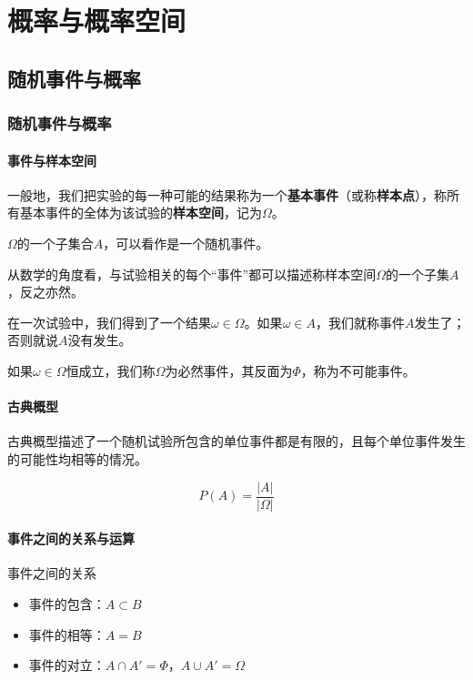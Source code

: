 \chapter{概率与概率空间}

\section{随机事件与概率}

\subsection{随机事件与概率}

\subsubsection{事件与样本空间}

一般地，我们把实验的每一种可能的结果称为一个\textbf{基本事件}（或称\textbf{样本点}），称所有基本事件的全体为该试验的\textbf{样本空间}，记为$\Omega$。

$\Omega$的一个子集合$A$，可以看作是一个随机事件。

从数学的角度看，与试验相关的每个“事件”都可以描述称样本空间$\Omega$的一个子集$A$，反之亦然。

在一次试验中，我们得到了一个结果$\omega \in \Omega$。如果$\omega \in A$，我们就称事件$A$发生了；否则就说$A$没有发生。

如果$\omega \in \Omega$恒成立，我们称$\Omega$为必然事件，其反面为$\Phi$，称为不可能事件。

\subsubsection{古典概型}

古典概型描述了一个随机试验所包含的单位事件都是有限的，且每个单位事件发生的可能性均相等的情况。

\begin{equation}
    P(A) = \frac{|A|}{|\Omega|}
\end{equation}

\subsubsection{事件之间的关系与运算}

事件之间的关系

\begin{itemize}[itemsep=0pt,parsep=0pt]
    \item 事件的包含：$A \subset B$
    \item 事件的相等：$A = B$
    \item 事件的对立：$A \cap A' = \Phi$，$A \cup A' = \Omega$
\end{itemize}

